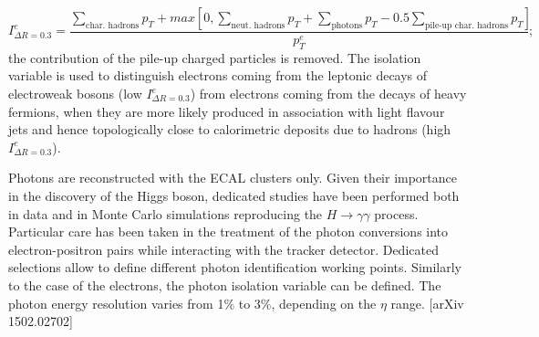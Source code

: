 \begin{equation}
I_{\Delta R = 0.3}^e = \frac{\sum_{\text{char. hadrons}} p_T + max\left[ 0, \sum_{\text{neut. hadrons}} p_T + \sum_{\text{photons}} p_T - 0.5 \sum_{\text{pile-up char. hadrons}} p_T\right]}{p_T^e};
\label{eq:electron_iso}
\end{equation}
the contribution of the pile-up charged particles is removed. The isolation variable is used to distinguish electrons coming from the leptonic decays of electroweak bosons (low $I_{\Delta R = 0.3}^e$) from electrons coming from the decays of heavy fermions, when they are more likely produced in association with light flavour jets and hence topologically close to calorimetric deposits due to hadrons (high $I_{\Delta R = 0.3}^e$).

\vspace*{1\baselineskip}

\noindent Photons are reconstructed with the ECAL clusters only. Given their importance in the discovery of the Higgs boson, dedicated studies have been performed both in data and in Monte Carlo simulations reproducing the $H \rightarrow \gamma \gamma$ process. Particular care has been taken in the treatment of the photon conversions into electron-positron pairs while interacting with the tracker detector. Dedicated selections allow to define different photon identification working points. Similarly to the case of the electrons, the photon isolation variable can be defined. The photon energy resolution varies from 1\% to 3\%, depending on the $\eta$ range. [arXiv 1502.02702]

